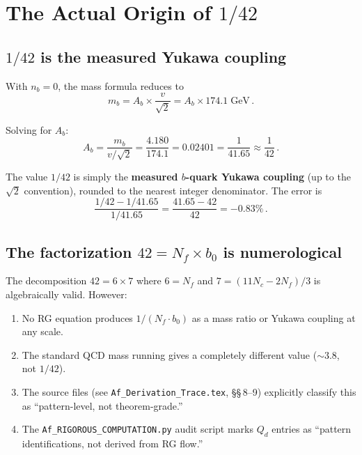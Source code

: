 \documentclass[11pt,a4paper]{article}
\newcommand{\Nf}{N_f}
\newcommand{\Nc}{N_c}
\theoremstyle{definition}
\theoremstyle{remark}
\begin{document}
\section{The Actual Origin of $1/42$}
\label{sec:origin}

\subsection{$1/42$ is the measured Yukawa coupling}

With $n_b = 0$, the mass formula reduces to
\begin{equation}
m_b = A_b \times \frac{v}{\sqrt{2}} = A_b \times 174.1\;\text{GeV}\,.
\end{equation}

Solving for $A_b$:
\begin{equation}
A_b = \frac{m_b}{v/\sqrt{2}} = \frac{4.180}{174.1} = 0.02401 = \frac{1}{41.65} \approx \frac{1}{42}\,.
\end{equation}

The value $1/42$ is simply the \textbf{measured $b$-quark Yukawa coupling}
(up to the $\sqrt{2}$ convention), rounded to the nearest integer denominator.
The error is
\begin{equation}
\frac{1/42 - 1/41.65}{1/41.65} = \frac{41.65 - 42}{42} = -0.83\%\,.
\end{equation}

\subsection{The factorization $42 = \Nf \times b_0$ is numerological}

The decomposition $42 = 6 \times 7$ where $6 = \Nf$ and
$7 = (11\Nc - 2\Nf)/3$ is algebraically valid.  However:
\begin{enumerate}
\item No RG equation produces $1/(\Nf \cdot b_0)$ as a mass ratio or
  Yukawa coupling at any scale.
\item The standard QCD mass running gives a completely different value
  ($\sim 3.8$, not $1/42$).
\item The source files (see \texttt{Af\_Derivation\_Trace.tex},
  \S\S\,8--9) explicitly classify this as ``pattern-level, not
  theorem-grade.''
\item The \texttt{Af\_RIGOROUS\_COMPUTATION.py} audit script marks $Q_d$
  entries as ``pattern identifications, not derived from RG flow.''
\end{enumerate}
\end{document}
